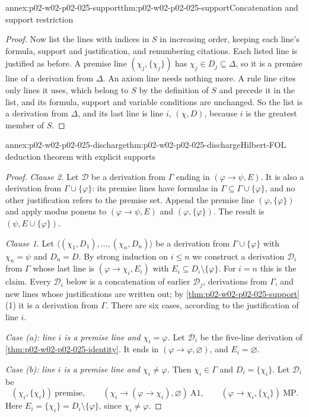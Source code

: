 \begin{annexitem}{annex:p02-w02-p02-025-support}{thm:p02-w02-p02-025-support}{Concatenation and support restriction}
\begin{proof}
Now list the lines with indices in \(S\) in increasing order, keeping each
line's formula, support and justification, and renumbering citations.
Each listed line is justified as before.  A premise line \((\chi_j,\{\chi_j\})\)
has \(\chi_j\in D_j\subseteq\Delta\), so it is a premise line of a
derivation from \(\Delta\).  An axiom line needs nothing more.  A rule line
cites only lines it uses, which belong to \(S\) by the definition of \(S\)
and precede it in the list, and its formula, support and variable conditions
are unchanged.  So the list is a derivation from \(\Delta\), and its last
line is line \(i\), \((\chi,D)\), because \(i\) is the greatest member of
\(S\).
\end{proof}
\end{annexitem}

\begin{annexitem}{annex:p02-w02-p02-025-discharge}{thm:p02-w02-p02-025-discharge}{Hilbert-FOL deduction theorem with explicit supports}
\begin{proof}
\emph{Clause 2.}  Let \(\mathcal D\) be a derivation from \(\Gamma\) ending in
\((\varphi\to\psi,E)\).  It is also a derivation from
\(\Gamma\cup\{\varphi\}\): its premise lines have formulas in
\(\Gamma\subseteq\Gamma\cup\{\varphi\}\), and no other justification refers to
the premise set.  Append the premise line \((\varphi,\{\varphi\})\) and apply
modus ponens to \((\varphi\to\psi,E)\) and \((\varphi,\{\varphi\})\).  The
result is \((\psi,E\cup\{\varphi\})\).

\emph{Clause 1.}  Let \(\langle(\chi_1,D_1),\ldots,(\chi_n,D_n)\rangle\) be a
derivation from \(\Gamma\cup\{\varphi\}\) with \(\chi_n=\psi\) and
\(D_n=D\).  By strong induction on \(i\leq n\) we construct a derivation
\(\mathcal D_i\) from \(\Gamma\) whose last line is
\((\varphi\to\chi_i,E_i)\) with \(E_i\subseteq D_i\setminus\{\varphi\}\).
For \(i=n\) this is the claim.  Every \(\mathcal D_i\) below is a
concatenation of earlier \(\mathcal D_j\), derivations from \(\Gamma\), and
new lines whose justifications are written out; by
\cref{thm:p02-w02-p02-025-support}(1) it is a derivation from \(\Gamma\).
There are six cases, according to the justification of line \(i\).

\emph{Case (a): line \(i\) is a premise line and \(\chi_i=\varphi\).}  Let
\(\mathcal D_i\) be the five-line derivation of
\cref{thm:p02-w02-p02-025-identity}.  It ends in
\((\varphi\to\varphi,\varnothing)\), and \(E_i=\varnothing\).

\emph{Case (b): line \(i\) is a premise line and \(\chi_i\neq\varphi\).}
Then \(\chi_i\in\Gamma\) and \(D_i=\{\chi_i\}\).  Let \(\mathcal D_i\) be
\[
 (\chi_i,\{\chi_i\})\ \text{premise},\qquad
 (\chi_i\to(\varphi\to\chi_i),\varnothing)\ \text{A1},\qquad
 (\varphi\to\chi_i,\{\chi_i\})\ \text{MP}.
\]
Here \(E_i=\{\chi_i\}=D_i\setminus\{\varphi\}\), since
\(\chi_i\neq\varphi\).


\end{proof}
\end{annexitem}
